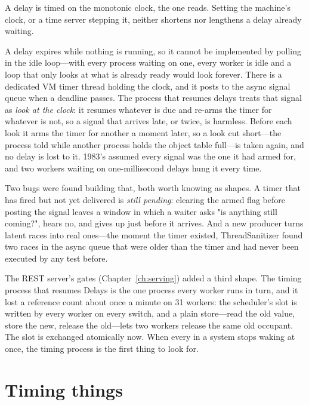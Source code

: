A delay is timed on the monotonic clock, the one
 reads. Setting the machine's clock, or a time
server stepping it, neither shortens nor lengthens a delay already waiting.

A delay expires while nothing is running, so it cannot be implemented by
polling in the idle loop---with every process waiting on one, every worker is
idle and a loop that only looks at what is already ready would look forever.
There is a dedicated VM timer thread holding the clock, and it posts to the
async signal queue when a deadline passes. The process that resumes delays
treats that signal as \emph{look at the clock}: it resumes whatever is due
and re-arms the timer for whatever is not, so a signal that arrives late, or
twice, is harmless. Before each look it arms the timer for another a moment
later, so a look cut short---the process told  while another
process holds the object table full---is taken again, and no delay is lost
to it. 1983's assumed every signal was the one it had armed for,
and two workers waiting on one-millisecond delays hung it every time.

\begin{stnote}
Two bugs were found building that, both worth knowing as shapes. A timer that
has fired but not yet delivered is \emph{still pending}: clearing the armed
flag before posting the signal leaves a window in which a waiter asks "is
anything still coming?", hears no, and gives up just before it arrives. And a
new producer turns latent races into real ones---the moment the timer existed,
ThreadSanitizer found two races in the async queue that were older than the
timer and had never been executed by any test before.

The REST server's gates (Chapter~\ref{ch:serving}) added a third shape.
The timing process that resumes Delays is the one process every worker runs
in turn, and it lost a reference count about once a minute on 31 workers:
the scheduler's  slot is written by every worker on every
switch, and a plain store---read the old value, store the new, release the
old---lets two workers release the same old occupant. The slot is exchanged
atomically now. When every  in a system stops waking at once, the
timing process is the first thing to look for.
\end{stnote}

\section{Timing things}

